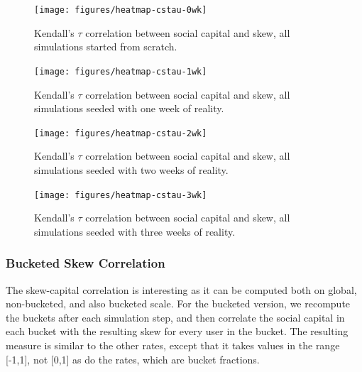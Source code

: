 \documentclass[10pt,oneside]{memoir}
\begin{document}
\begin{Spacing}{2}
\begin{figure}
\begin{center}
    \texttt{[image: figures/heatmap-cstau-0wk]}
    \caption{Kendall’s $\tau$ correlation between social capital and skew, all simulations started from scratch.}
    \label{figure:heatmap-cstau-0wk}
\end{center}
\end{figure}

\begin{figure}
\begin{center}
    \texttt{[image: figures/heatmap-cstau-1wk]}
    \caption{Kendall’s $\tau$ correlation between social capital and skew, all simulations seeded with one week of reality.}
    \label{figure:heatmap-cstau-1wk}
\end{center}
\end{figure}

\begin{figure}
\begin{center}
    \texttt{[image: figures/heatmap-cstau-2wk]}
    \caption{Kendall’s $\tau$ correlation between social capital and skew, all simulations seeded with two weeks of reality.}
    \label{figure:heatmap-cstau-2wk}
\end{center}
\end{figure}

\begin{figure}
\begin{center}
    \texttt{[image: figures/heatmap-cstau-3wk]}
    \caption{Kendall’s $\tau$ correlation between social capital and skew, all simulations seeded with three weeks of reality.}
    \label{figure:heatmap-cstau-3wk}
\end{center}
\end{figure}
\pagebreak \subsubsection{Bucketed Skew Correlation}
\label{bucketedskewcorrelation}

The skew-capital correlation is interesting as it can be computed both on global, non-bucketed, and also bucketed scale.  For the bucketed version, we recompute the buckets after each simulation step, and then correlate the social capital in each bucket with the resulting skew for every user in the bucket.  The resulting measure is similar to the other rates, except that it takes values in the range [-1,1], not [0,1] as do the rates, which are bucket fractions.



\end{Spacing}
\end{document}
